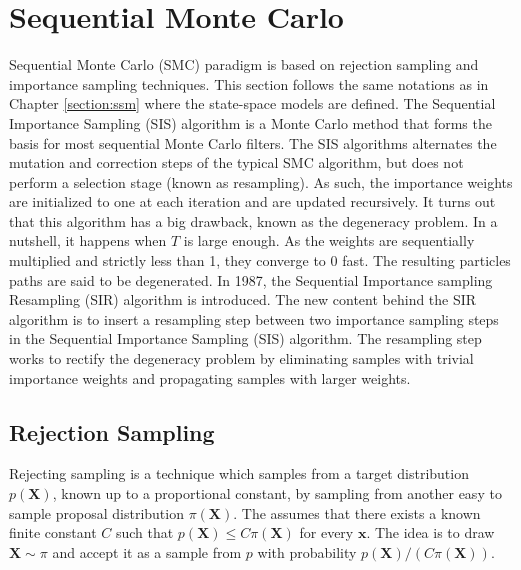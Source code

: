 \documentclass[11pt,a4,twosided,singlespacing,titlepagenumber=on]{scrreprt}
\numberwithin{equation}{chapter} %
\theoremstyle{remark}
\newcommand{\matr}[1]{\mathbf{#1}}
\begin{document}
\section{Sequential Monte Carlo}
\label{section:smc}
Sequential Monte Carlo (SMC) paradigm is based on rejection sampling and importance sampling techniques. This section follows the same notations as in Chapter \ref{section:ssm} where the state-space models are defined. The Sequential Importance Sampling (SIS) algorithm is a Monte Carlo method that forms the basis for most sequential Monte Carlo filters. The SIS algorithms alternates the mutation and correction steps of the typical SMC algorithm, but does not perform a selection stage (known as resampling). As such, the importance weights are initialized to one at each iteration and are updated recursively. It turns out that this algorithm has a big drawback, known as the degeneracy problem. In a nutshell, it happens when $T$ is large enough. As the weights are sequentially multiplied and strictly less than 1, they converge to 0 fast. The resulting particles paths are said to be degenerated. In 1987, the Sequential Importance sampling Resampling (SIR) algorithm is introduced. The new content behind the SIR algorithm is to insert a resampling step between two importance sampling steps in the Sequential Importance Sampling (SIS) algorithm. The resampling step works to rectify the degeneracy problem by eliminating samples with trivial importance weights and propagating samples with larger weights.

\subsection{Rejection Sampling}
Rejecting sampling is a technique which samples from a target distribution $p(\matr{X})$, known up to a proportional constant, by sampling from another easy to sample proposal distribution $\pi(\matr{X})$. The assumes that there exists a known finite constant $C$ such that $p(\matr{X}) \leq C \pi(\matr{X})$ for every $\matr{x}$. The idea is to draw $\matr{X} \sim \pi$ and accept it as a sample from $p$ with probability $p(\matr{X}) / ( C \pi(\matr{X}))$.
\end{document}
